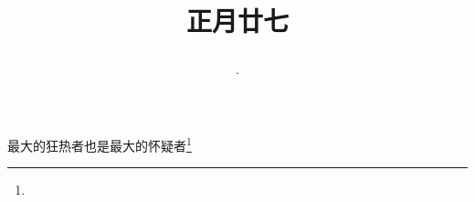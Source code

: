 \title{\date[d=7,m=3,y=2024][year:cn-y,年,month:cn,day:cn,日,·,weekday]·正月廿七 }
最大的狂热者也是最大的怀疑者\footnote{ }

